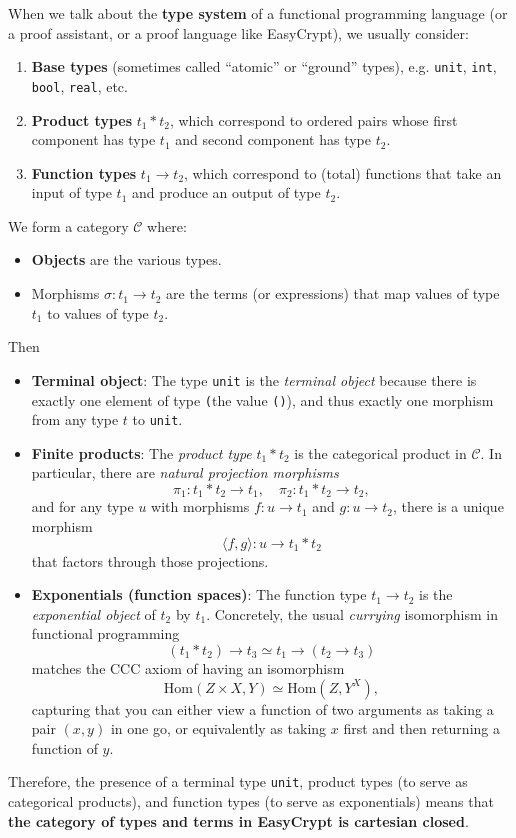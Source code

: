 When we talk about the \textbf{type system} of a functional programming language (or a proof assistant, or a proof language like EasyCrypt), we usually consider:
\begin{enumerate}
	\item \textbf{Base types} (sometimes called ``atomic'' or ``ground'' types), e.g. 
	\texttt{unit}, \texttt{int}, \texttt{bool}, \texttt{real}, etc.
	\item \textbf{Product types} $t_1*t_2$, which correspond to ordered pairs whose first component has type $t_1$ and second component has type $t_2$.
	\item \textbf{Function types} $t_1\to t_2$, which correspond to (total) functions that take an input of type $t_1$ and produce an output of type $t_2$.
\end{enumerate}
We form a category $\mathcal{C}$ where: \begin{itemize}
	\item \textbf{Objects} are the various types.
	\item Morphisms $\sigma:t_1\to t_2$ are the terms (or expressions) that map values of type 
	$t_1$ to values of type $t_2$.
\end{itemize} Then \begin{itemize}
\item \textbf{Terminal object}: The type \texttt{unit} is the \textit{terminal object} because there is exactly one element of type \texttt (the value \texttt{()}), and thus exactly one morphism from any type $t$ to \texttt{unit}.
\item \textbf{Finite products}: The \textit{product type} $t_1*t_2$ is the categorical product in $\mathcal{C}$. In particular, there are \textit{natural projection morphisms} \[
\pi_1:t_1*t_2\to t_1,\quad \pi_2:t_1*t_2\to t_2,
\] and for any type $u$ with morphisms $f:u\to t_1$ and $g:u\to t_2$, there is a unique morphism \[
\langle f,g\rangle:u\to t_1*t_2
\] that factors through those projections.
\item \textbf{Exponentials (function spaces)}: The function type $t_1\to t_2$ is the \textit{exponential object} of $t_2$ by $t_1$. Concretely, the usual \textit{currying} isomorphism in functional programming \[
(t_1*t_2)\to t_3\simeq t_1\to(t_2\to t_3)
\] matches the CCC axiom of having an isomorphism \[
\text{Hom}(Z\times X, Y)\simeq\text{Hom}(Z,Y^X),
\] capturing that you can either view a function of two arguments as taking a pair 
$(x,y)$ in one go, or equivalently as taking $x$ first and then returning a function of 
$y$.
\end{itemize}
Therefore, the presence of a terminal type \texttt{unit}, product types (to serve as categorical products), and function types (to serve as exponentials) means that \textbf{the category of types and terms in EasyCrypt is cartesian closed}.

